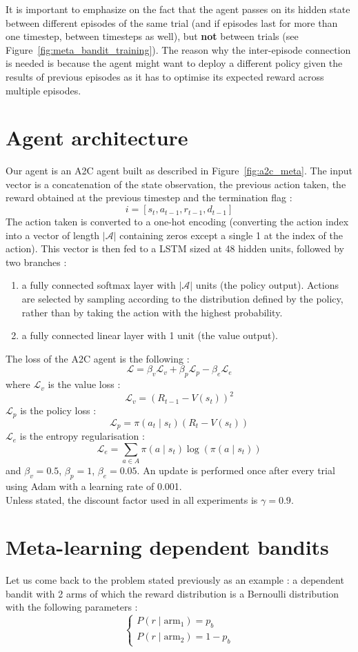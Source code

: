 It is important to emphasize on the fact that the agent passes on its hidden
state between different episodes of the same trial (and if episodes last for
more than one timestep, between timesteps as well), but \textbf{not} between
trials (see Figure~\ref{fig:meta_bandit_training}).
The reason why the inter-episode connection is needed is because
the agent might want to deploy a different policy given the results of 
previous episodes as it has to optimise its expected reward across multiple
episodes.

\section{Agent architecture}
Our agent is an A2C agent built as described in Figure~\ref{fig:a2c_meta}.
The input vector is a concatenation of the state observation, the previous
action taken, the reward obtained at the previous timestep and the termination
flag :
$$ i = [s_t, a_{t-1}, r_{t-1}, d_{t-1}] $$
The action taken is converted to a one-hot encoding (converting the action
index into a vector of length $|\mathcal{A}|$ containing zeros except a single
1 at the index of the action). This vector is then fed to a LSTM sized at 48
hidden units, followed by two branches :
\begin{enumerate}
	\item a fully connected softmax layer with $|\mathcal{A}|$ units (the policy
		output). Actions are selected by sampling according to the
		distribution defined by the policy, rather than by taking the
		action with the highest probability.
	\item a fully connected linear layer with 1 unit (the value output).
\end{enumerate}
The loss of the A2C agent is the following : 
$$ \mathcal{L} = \beta_v \mathcal{L}_v + \beta_p \mathcal{L}_p - \beta_e 
 \mathcal{L}_e $$
where $\mathcal{L}_v$ is the value loss : 
$$ \mathcal{L}_v = (R_{t-1} - V(s_t))^2$$
$\mathcal{L}_p$ is the policy loss : 
$$ \mathcal{L}_p = \pi(a_t \mid s_t) (R_t - V(s_t))$$
$\mathcal{L}_e$ is the entropy regularisation : 
$$ \mathcal{L}_e = \sum\limits_{a \in A}\pi(a \mid s_t)\log(\pi(a \mid s_t))$$
and $\beta_v = 0.5$, $\beta_p = 1$, $\beta_e = 0.05$. An update is performed
once after every trial using Adam \cite{adam} with a learning rate of 0.001.\\

Unless stated, the discount factor used in all experiments is $\gamma=0.9$. 


\section{Meta-learning dependent bandits}
Let us come back to the problem stated previously as an example : a dependent
bandit with 2 arms of which the reward distribution is a Bernoulli distribution
with the following parameters : 
$$ \begin{cases} P(r \mid \text{arm}_1) = p_b \\ 
P(r \mid \text{arm}_2) = 1 - p_b  \end{cases} $$

